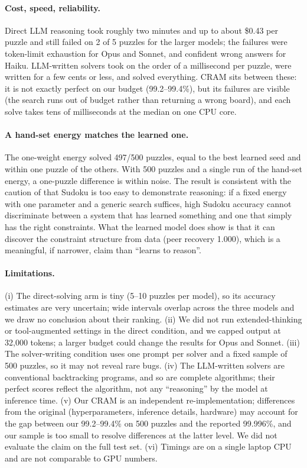 \documentclass{article} %
\begin{document}
\paragraph{Cost, speed, reliability.} Direct LLM reasoning took roughly two minutes and up to about \$0.43 per puzzle and still failed on 2 of 5 puzzles for the larger models; the failures were token-limit exhaustion for Opus and Sonnet, and confident wrong answers for Haiku. LLM-written solvers took on the order of a millisecond per puzzle, were written for a few cents or less, and solved everything. CRAM sits between these: it is not exactly perfect on our budget (99.2--99.4\%), but its failures are visible (the search runs out of budget rather than returning a wrong board), and each solve takes tens of milliseconds at the median on one CPU core.

\paragraph{A hand-set energy matches the learned one.} The one-weight energy solved 497/500 puzzles, equal to the best learned seed and within one puzzle of the others. With 500 puzzles and a single run of the hand-set energy, a one-puzzle difference is within noise. The result is consistent with the caution of \citet{hoover2026cram} that Sudoku is too easy to demonstrate reasoning: if a fixed energy with one parameter and a generic search suffices, high Sudoku accuracy cannot discriminate between a system that has learned something and one that simply has the right constraints. What the learned model does show is that it can discover the constraint structure from data (peer recovery 1.000), which is a meaningful, if narrower, claim than ``learns to reason''.

\paragraph{Limitations.} (i) The direct-solving arm is tiny (5--10 puzzles per model), so its accuracy estimates are very uncertain; wide intervals overlap across the three models and we draw no conclusion about their ranking. (ii) We did not run extended-thinking or tool-augmented settings in the direct condition, and we capped output at 32,000 tokens; a larger budget could change the results for Opus and Sonnet. (iii) The solver-writing condition uses one prompt per solver and a fixed sample of 500 puzzles, so it may not reveal rare bugs. (iv) The LLM-written solvers are conventional backtracking programs, and so are complete algorithms; their perfect scores reflect the algorithm, not any ``reasoning'' by the model at inference time. (v) Our CRAM is an independent re-implementation; differences from the original (hyperparameters, inference details, hardware) may account for the gap between our 99.2--99.4\% on 500 puzzles and the reported 99.996\%, and our sample is too small to resolve differences at the latter level. We did not evaluate the claim on the full test set. (vi) Timings are on a single laptop CPU and are not comparable to GPU numbers.
\end{document}
